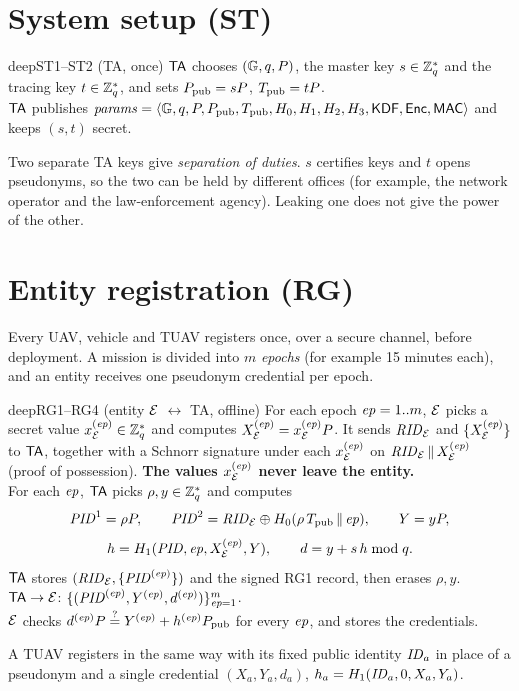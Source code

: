 \section{System setup (ST)}
\begin{stepbox}{deep}{ST1--ST2 \;(TA, once)}
 $\mathsf{TA}$ chooses $(\mathbb{G},q,P)$, the master key $s\in\mathbb{Z}_q^{*}$ and the tracing key $t\in\mathbb{Z}_q^{*}$, and sets $P_{\mathrm{pub}}=sP$, $T_{\mathrm{pub}}=tP$.\\
 $\mathsf{TA}$ publishes $\mathit{params}=\langle \mathbb{G},q,P,P_{\mathrm{pub}},T_{\mathrm{pub}},H_0,H_1,H_2,H_3,\mathsf{KDF},\mathsf{Enc},\mathsf{MAC}\rangle$ and keeps $(s,t)$ secret.
\end{stepbox}
\begin{whybox}
Two separate TA keys give \emph{separation of duties}. $s$ certifies keys and $t$ opens pseudonyms, so the two can be held by different offices
(for example, the network operator and the law-enforcement agency). Leaking one does not give the power of the other.
\end{whybox}

\section{Entity registration (RG)}
Every UAV, vehicle and TUAV registers once, over a secure channel, before deployment. A mission is divided into $m$ \emph{epochs}
(for example 15 minutes each), and an entity receives one pseudonym credential per epoch.

\begin{stepbox}{deep}{RG1--RG4 \;(entity $\mathcal{E}$ $\leftrightarrow$ TA, offline)}
 For each epoch $\mathit{ep}=1..m$, $\mathcal{E}$ picks a secret value $x^{(\mathit{ep})}_{\mathcal{E}}\in\mathbb{Z}_q^{*}$ and computes $X^{(\mathit{ep})}_{\mathcal{E}}=x^{(\mathit{ep})}_{\mathcal{E}} P$.
It sends $\mathit{RID}_{\mathcal{E}}$ and $\{X^{(\mathit{ep})}_{\mathcal{E}}\}$ to $\mathsf{TA}$, together with a Schnorr signature under each $x^{(\mathit{ep})}_{\mathcal{E}}$ on $\mathit{RID}_{\mathcal{E}}\,\|\, X^{(\mathit{ep})}_{\mathcal{E}}$
(proof of possession). \textbf{The values $x^{(\mathit{ep})}_{\mathcal{E}}$ never leave the entity.}\\[2pt]
 For each $\mathit{ep}$, $\mathsf{TA}$ picks $\rho,y\in\mathbb{Z}_q^{*}$ and computes
\[
 \mathit{PID}^1=\rho P,\qquad \mathit{PID}^2=\mathit{RID}_{\mathcal{E}}\oplus H_0(\rho\,T_{\mathrm{pub}}\,\|\,\mathit{ep}),\qquad Y=yP,
\]
\[
 h=H_1(\mathit{PID},\mathit{ep},X^{(\mathit{ep})}_{\mathcal{E}},Y),\qquad d=y+s\,h \bmod q .
\]
$\mathsf{TA}$ stores $(\mathit{RID}_{\mathcal{E}},\{\mathit{PID}^{(\mathit{ep})}\})$ and the signed RG1 record, then erases $\rho,y$.\\[2pt]
 $\mathsf{TA}\to\mathcal{E}$: $\{(\mathit{PID}^{(\mathit{ep})},Y^{(\mathit{ep})},d^{(\mathit{ep})})\}_{\mathit{ep}=1}^{m}$.\\[2pt]
 $\mathcal{E}$ checks $d^{(\mathit{ep})}P\overset{?}{=}Y^{(\mathit{ep})}+h^{(\mathit{ep})}P_{\mathrm{pub}}$ for every $\mathit{ep}$, and stores the credentials.
\end{stepbox}
\noindent A TUAV registers in the same way with its fixed public identity $\mathit{ID}_a$ in place of a pseudonym and a single credential
$(X_a,Y_a,d_a)$, $h_a=H_1(\mathit{ID}_a,0,X_a,Y_a)$.

